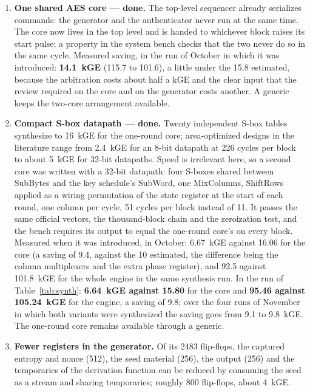 \begin{enumerate}
\item \textbf{One shared AES core --- done.} The top-level sequencer
already serializes commands: the generator and the authenticator never
run at the same time. The core now lives in the top level and is handed
to whichever block raises its start pulse; a property in the system
bench checks that the two never do so in the same cycle. Measured
saving, in the run of October in which it was introduced:
\textbf{14.1~kGE} (115.7 to 101.6), a little under the 15.8
estimated, because the arbitration costs about half a kGE and the clear
input that the review required on the core and on the generator costs
another. A generic keeps the two-core arrangement available.
\item \textbf{Compact S-box datapath --- done.} Twenty independent S-box
tables synthesize to 16~kGE for the one-round core; area-optimized
designs in the literature range from 2.4~kGE for an 8-bit datapath at 226
cycles per block~\cite{moradi2011pushing} to about 5~kGE for 32-bit
datapaths. Speed is irrelevant here, so a second core was written with a
32-bit datapath: four S-boxes shared between SubBytes and the key
schedule's SubWord, one MixColumns, ShiftRows applied as a wiring
permutation of the state register at the start of each round, one column
per cycle, 51 cycles per block instead of 11. It passes the same official
vectors, the thousand-block chain and the zeroization test, and the bench
requires its output to equal the one-round core's on every block. Measured
when it was introduced, in October:
6.67~kGE against 16.06 for the core (a saving of 9.4, against
the 10 estimated, the difference being the column multiplexers and the
extra phase register), and 92.5 against 101.8~kGE for the whole
engine in the same synthesis run. In the run of Table~\ref{tab:synth}:
\textbf{6.64~kGE against 15.80} for the core and \textbf{95.46 against
105.24~kGE} for the engine, a saving of 9.8; over the four runs of
November in which both variants were synthesized the saving goes from
9.1 to 9.8~kGE. The one-round core remains
available through a generic.
\item \textbf{Fewer registers in the generator.} Of its 2483 flip-flops,
the captured entropy and nonce (512), the seed material (256), the output
(256) and the temporaries of the derivation function can be reduced by
consuming the seed as a stream and sharing temporaries; roughly 800
flip-flops, about 4~kGE.
\end{enumerate}

